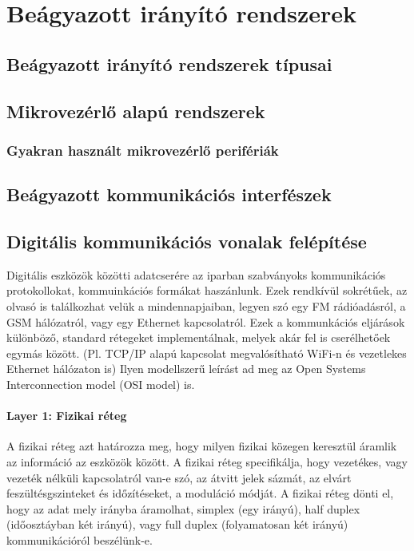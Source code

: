 \section{Beágyazott irányító rendszerek}
\vspace{5cm}
\subsection{Beágyazott irányító rendszerek típusai}

\subsection{Mikrovezérlő alapú rendszerek}

\subsubsection{Gyakran használt mikrovezérlő perifériák}

\subsection{Beágyazott kommunikációs interfészek}

\subsection{Digitális kommunikációs vonalak felépítése}

Digitális eszközök közötti adatcserére az iparban szabványoks kommunikációs protokollokat, kommuinkációs formákat haszánlunk. Ezek rendkívül sokrétűek, az olvasó is találkozhat velük a mindennapjaiban, legyen szó egy FM rádióadásról, a GSM hálózatról, vagy egy Ethernet kapcsolatról. Ezek a kommunkációs eljárások különböző, standard rétegeket implementálnak, melyek akár fel is cserélhetőek egymás között. (Pl. TCP/IP alapú kapcsolat megvalósítható WiFi-n és vezetlekes Ethernet hálózaton is) Ilyen modellszerű leírást ad meg az Open Systems Interconnection model (OSI model) is.

\paragraph{Layer 1: Fizikai réteg}

A fizikai réteg azt határozza meg, hogy milyen fizikai közegen keresztül áramlik az információ az eszközök között. A fizikai réteg specifikálja, hogy vezetékes, vagy vezeték nélküli kapcsolatról van-e szó, az átvitt jelek sázmát, az elvárt feszültésgszinteket és időzítéseket, a moduláció módját. A fizikai réteg dönti el, hogy az adat mely irányba áramolhat, simplex (egy irányú), half duplex (időosztáyban két irányú), vagy full duplex (folyamatosan két irányú) kommunikációról beszélünk-e.

